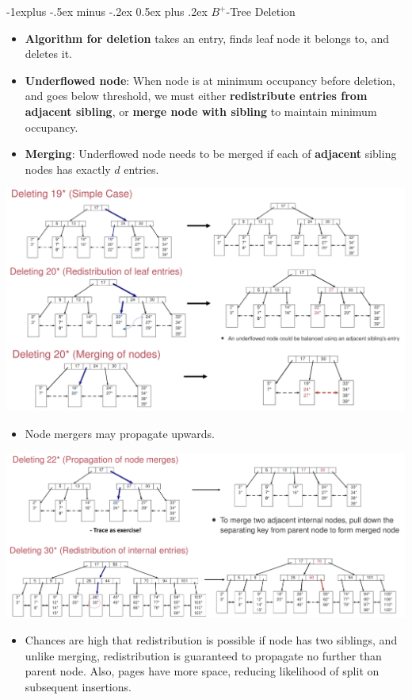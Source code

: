 \documentclass[10pt, landscape]{article}
\makeatletter
\renewcommand{\subsection}{\@startsection{subsection}{2}{0mm}%
                                {-1explus -.5ex minus -.2ex}%
                                {0.5ex plus .2ex}%
                                {\normalfont\normalsize\bfseries}}
\makeatother
\begin{document}
\begin{multicols*}{3}
\subsection{$B^+$-Tree Deletion}
\begin{itemize}
\item \textbf{Algorithm for deletion} takes an entry, finds leaf node it belongs to, and deletes it.
\item \textbf{Underflowed node}: When node is at minimum occupancy before deletion, and goes below threshold, we must either \textbf{redistribute entries from adjacent sibling}, or \textbf{merge node with sibling} to maintain minimum occupancy.
\item \textbf{Merging}: Underflowed node needs to be merged if each of \textbf{adjacent} sibling nodes has exactly $d$ entries.
\end{itemize}
\centerline{\includegraphics[width = 1\linewidth]{Bdeletion1}}
\begin{itemize}
\item  Node mergers may propagate upwards.
\end{itemize}
\centerline{\includegraphics[width = 1\linewidth]{Bdeletion2}}
\begin{itemize}
\item Chances are high that redistribution is possible if node has two siblings, and unlike merging, redistribution is guaranteed to propagate no further than parent node. Also, pages have more space, reducing likelihood of split on subsequent insertions.
\end{itemize}


\end{multicols*}
\end{document}
